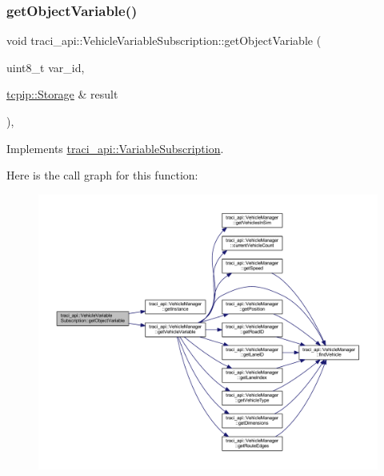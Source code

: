 \subsubsection{\texorpdfstring{get\+Object\+Variable()}{getObjectVariable()}}
{\footnotesize\ttfamily void traci\+\_\+api\+::\+Vehicle\+Variable\+Subscription\+::get\+Object\+Variable (\begin{DoxyParamCaption}\item[{uint8\+\_\+t}]{var\+\_\+id,  }\item[{\hyperlink{classtcpip_1_1_storage}{tcpip\+::\+Storage} \&}]{result }\end{DoxyParamCaption})\hspace{0.3cm}{\ttfamily [override]}, {\ttfamily [virtual]}}



Implements \hyperlink{classtraci__api_1_1_variable_subscription_a884dba03a44455e86c417c3641ec6aa4}{traci\+\_\+api\+::\+Variable\+Subscription}.

Here is the call graph for this function\+:\nopagebreak
\begin{figure}[H]
\begin{center}
\leavevmode
\includegraphics[width=350pt]{classtraci__api_1_1_vehicle_variable_subscription_afaefff100368a747aefb8be29e8a7a91_cgraph}
\end{center}
\end{figure}
\mbox{\label{classtraci__api_1_1_vehicle_variable_subscription_a77ac472ae8dc1f284c2ec3f64b88cd0d}} 

